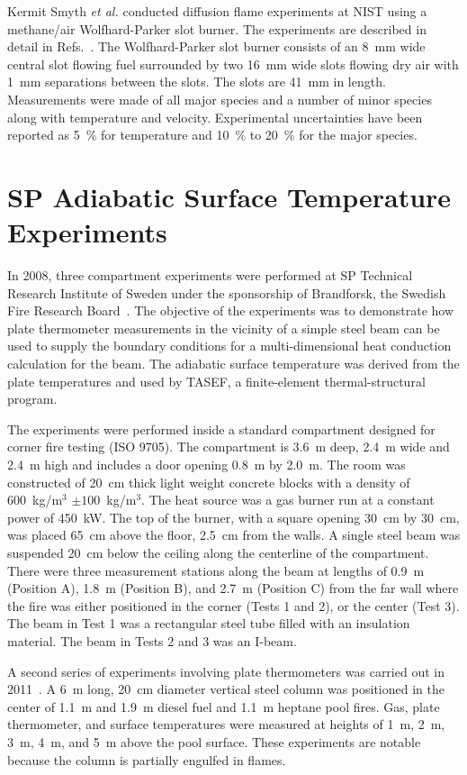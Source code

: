 Kermit Smyth {\em et al.} conducted diffusion flame experiments at NIST using a methane/air Wolfhard-Parker slot burner.  The experiments are described in
detail in Refs.~\cite{Norton:1,Smyth:1}.  The Wolfhard-Parker slot burner consists of an 8~mm wide
central slot flowing fuel surrounded by two 16~mm wide slots flowing dry air with 1~mm separations between the slots.
The slots are 41~mm in length.  Measurements were made of all major species and a number of minor species along with temperature
and velocity.  Experimental uncertainties have been reported as 5~\% for temperature  and 10~\% to 20~\%
for the major species.


\section{SP Adiabatic Surface Temperature Experiments}

In 2008, three compartment experiments were performed at SP Technical Research Institute of Sweden under the sponsorship of Brandforsk, the Swedish Fire Research Board~\cite{Wickstrom_AST}. The
objective of the experiments was to demonstrate how plate thermometer measurements in the vicinity of a simple steel beam can be used to supply the boundary conditions
for a multi-dimensional heat conduction calculation for the beam. The adiabatic surface temperature was derived from the plate temperatures and used by TASEF, a finite-element
thermal-structural program.

The experiments were performed inside a standard compartment designed for corner fire testing (ISO 9705).
The compartment is 3.6~m deep, 2.4~m wide and 2.4~m high and includes a door opening 0.8~m by 2.0~m. The room was constructed of 20~cm thick light weight concrete
blocks with a density of 600~kg/m$^3$ $\pm 100$~kg/m$^3$.
The heat source was a gas burner run at a constant power of 450~kW. The top of the burner, with a square opening 30~cm by 30~cm, was placed 65~cm above the floor, 2.5~cm from the walls.
A single steel beam was suspended 20~cm below the ceiling
along the centerline of the compartment. There were three measurement stations along the beam at lengths of 0.9~m (Position A), 1.8~m (Position B), and
2.7~m (Position C) from the far wall where the fire was either positioned in the corner (Tests 1 and 2), or the center (Test 3). The beam in Test 1 was
a rectangular steel tube filled with an insulation material. The beam in Tests 2 and 3 was an I-beam.

A second series of experiments involving plate thermometers was carried out in 2011~\cite{Sjostrom:AST}.
A 6~m long, 20~cm diameter vertical steel column was positioned in the center of 1.1~m and 1.9~m diesel fuel and 1.1~m heptane
pool fires. Gas, plate thermometer, and surface temperatures were measured at heights of 1~m, 2~m, 3~m, 4~m, and 5~m above the pool surface. These experiments are notable because
the column is partially engulfed in flames.





